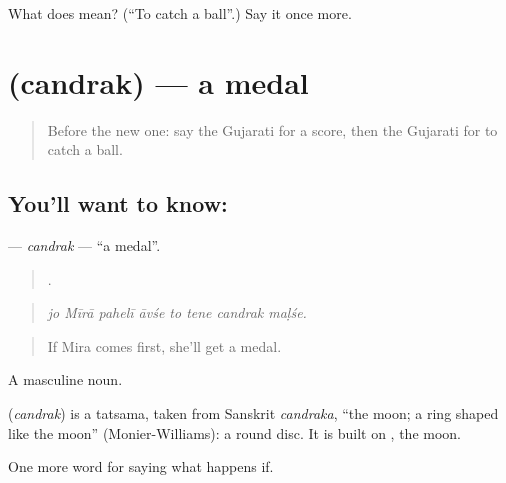 \begin{tcolorbox}[breakable,colback=teal!4,colframe=teal!35!black,title={Before you move on}]
What does  mean? (\textquotedblleft{}To catch a ball\textquotedblright{}.) Say it once more.
\end{tcolorbox}
\section[\texorpdfstring{\gu{ચંદ્રક} (candrak)}{ચંદ્રક (candrak)}]{ (candrak) — a medal}

\label{lesson:GU-C549-candrak}



\begin{quote}
Before the new one: say the Gujarati for a score, then the Gujarati for to catch a ball.
\end{quote}

\subsection*{You'll want to know: }
\textbf{} — \emph{candrak} — \textquotedblleft{}a medal\textquotedblright{}.

\begin{quote}
       .
\end{quote}

\begin{quote}
\emph{jo Mīrā pahelī āvśe to tene candrak maḷśe.}
\end{quote}

\begin{quote}
If Mira comes first, she'll get a medal.
\end{quote}

A masculine noun.

\begin{cousinweb}
\textbf{} (\emph{candrak}) is a tatsama, taken from Sanskrit \emph{candraka}, \textquotedblleft{}the moon; a ring shaped like the moon\textquotedblright{} (Monier-Williams): a round disc. It is built on \textbf{}, the moon.
\end{cousinweb}

\begin{grammarlens}[title={What you've built}]
One more word for saying what happens if.
\end{grammarlens}

